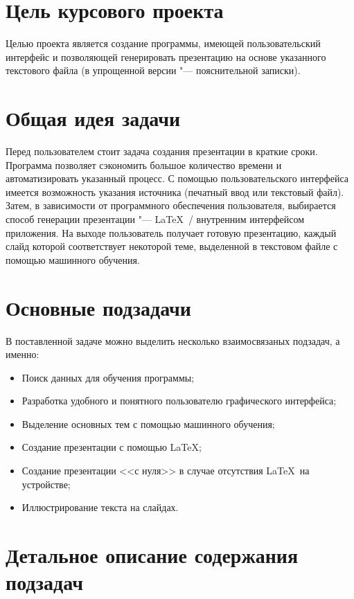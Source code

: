   \hypertarget{intro}{}
  \tableofcontents
  \newpage

  \section{Цель курсового проекта}

  Целью проекта является создание программы, имеющей пользовательский интерфейс 
  и позволяющей генерировать презентацию на основе указанного текстового файла 
  (в упрощенной версии "--- пояснительной записки). 

  \section{Общая идея задачи}

  Перед пользователем стоит задача создания презентации в краткие сроки.
  Программа позволяет сэкономить большое количество времени и автоматизировать указанный процесс.
  С помощью пользовательского интерфейса имеется возможность указания источника
  (печатный ввод или текстовый файл). Затем, в зависимости от программного обеспечения пользователя,
  выбирается способ генерации презентации "--- \LaTeX~/ внутренним интерфейсом приложения.
  На выходе пользователь получает готовую презентацию, каждый слайд которой соответствует 
  некоторой теме, выделенной в текстовом файле с помощью машинного обучения.

  \section{Основные подзадачи}

  В поставленной задаче можно выделить несколько взаимосвязаных подзадач, а именно:
  \begin{itemize}
    \item Поиск данных для обучения программы;
    \item Разработка удобного и понятного пользователю графического интерфейса;
    \item Выделение основных тем с помощью машинного обучения;
    \item Создание презентации с помощью \LaTeX;
    \item Создание презентации <<с нуля>> в случае отсутствия \LaTeX~на устройстве;
    \item Иллюстрирование текста на слайдах. 
  \end{itemize}

  \section{Детальное описание содержания подзадач}

